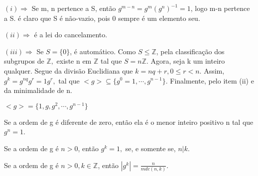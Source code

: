 \documentclass[algebra_notes.tex]{subfiles}
\begin{document}
\begin{proof*}
	$(i)\Rightarrow$ Se m, n pertence a S, então $g^{m-n} = g^{m}(g^{n})^{-1} = 1$, logo m-n pertence a S. é claro que S é não-vazio, pois 0 sempre é um elemento seu.

	$(ii)\Rightarrow$ é a lei do cancelamento.

	$(iii)\Rightarrow$ Se $S = \{0\}$, é automático. Como $S\leq{\mathbb{Z}}$, pela classificação dos subgrupos de $\mathbb{Z},$
	existe n em $\mathbb{Z}$ tal que $S = n \mathbb{Z}$. Agora, seja k um inteiro qualquer. Segue da divisão Euclidiana que
	$k = nq + r, 0\leq{r}<n$. Assim, $g^{k} = g^{nq}g^{r} = 1g^{r},$ tal que $<g> \subseteq{\{g^{0}=1, \cdots, g^{n-1}\}}$. Finalmente, pelo
	item (ii) e da minimalidade de n. \qedsymbol
\end{proof*}
\begin{crl*}
	$<g> = \{1, g, g^{2}, \cdots, g^{n-1}\} $
\end{crl*}
\begin{crl*}
	Se a ordem de g é diferente de zero, então ela é o menor inteiro positivo n tal que $g^{n} = 1$.
\end{crl*}
\begin{crl*}
	Se a ordem de g é $n>{0}$, então $g^{k} = 1,$ se, e somente se, $n|k.$
\end{crl*}
\begin{crl*}
	Se a ordem de g é $n>0, k\in \mathbb{Z}$, então $|g^{k}|=\displaystyle \frac{n}{mdc(n, k)}$.
\end{crl*}
\end{document}
